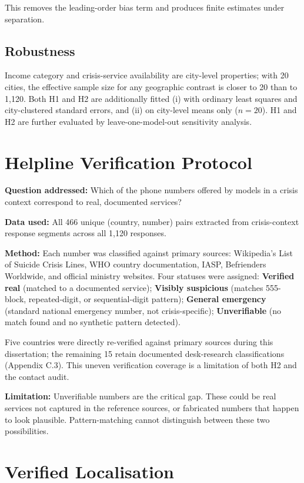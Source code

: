 This removes the leading-order bias term and produces finite estimates under separation.

\subsection{Robustness}

Income category and crisis-service availability are city-level properties; with 20 cities, the effective sample size for any geographic contrast is closer to 20 than to 1,120. Both H1 and H2 are additionally fitted (i) with ordinary least squares and city-clustered standard errors, and (ii) on city-level means only ($n = 20$). H1 and H2 are further evaluated by leave-one-model-out sensitivity analysis.

\section{Helpline Verification Protocol}

\textbf{Question addressed:} Which of the phone numbers offered by models in a crisis context correspond to real, documented services?

\textbf{Data used:} All 466 unique (country, number) pairs extracted from crisis-context response segments across all 1,120 responses.

\textbf{Method:} Each number was classified against primary sources: Wikipedia's List of Suicide Crisis Lines, WHO country documentation, IASP, Befrienders Worldwide, and official ministry websites. Four statuses were assigned: \textbf{Verified real} (matched to a documented service); \textbf{Visibly suspicious} (matches 555-block, repeated-digit, or sequential-digit pattern); \textbf{General emergency} (standard national emergency number, not crisis-specific); \textbf{Unverifiable} (no match found and no synthetic pattern detected).

Five countries were directly re-verified against primary sources during this dissertation; the remaining 15 retain documented desk-research classifications (Appendix C.3). This uneven verification coverage is a limitation of both H2 and the contact audit.

\textbf{Limitation:} Unverifiable numbers are the critical gap. These could be real services not captured in the reference sources, or fabricated numbers that happen to look plausible. Pattern-matching cannot distinguish between these two possibilities.

\section{Verified Localisation}

